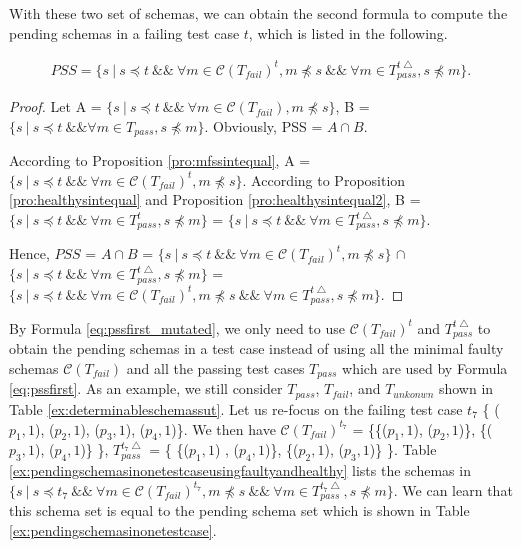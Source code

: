 With these two set of schemas, we can obtain the second formula to compute the pending schemas in a failing test case $t$, which is listed in the following.

\begin{equation}
\begin{aligned}\label{eq:pssfirst_mutated}
PSS=\{ s\ |\ s \preceq t\ \&\&\ \forall m \in \mathcal{C}(T_{fail})^{t},  m \npreceq s  \ \&\&\  \forall m \in T_{pass}^{t\bigtriangleup}, s \npreceq m \} .
\end{aligned}
\end{equation}

\begin{proof}

Let A = $\{ s\ |\  s \preceq t\ \&\&\ \forall m \in \mathcal{C}(T_{fail}),  m \npreceq s \}$, B = $ \{ s\ |\ s \preceq t\ \&\&  \forall m \in T_{pass}, s \npreceq m \} $. Obviously, PSS = $A \cap B$.

According to Proposition \ref{pro:mfssintequal}, A = $\{ s\ |\  s \preceq t\ \&\&\ \forall m \in \mathcal{C}(T_{fail})^{t},  m \npreceq s \}$.
According to Proposition \ref{pro:healthysintequal} and Proposition \ref{pro:healthysintequal2}, B = $\{ s\ |\  s \preceq t\ \&\&\ \forall m \in T_{pass}^{t},  s \npreceq m \}$ = $\{ s\ |\  s \preceq t\ \&\&\ \forall m \in T_{pass}^{t\bigtriangleup},  s \npreceq m \}$.

Hence, $PSS$ = $A \cap B$ = $\{ s\ |\  s \preceq t\ \&\&\ \forall m \in \mathcal{C}(T_{fail})^{t},  m \npreceq s \}$ $\cap$ $\{ s\ |\  s \preceq t\ \&\&\ \forall m \in T_{pass}^{t\bigtriangleup},  s \npreceq m \}$ = $\{ s\ |\ s \preceq t\ \&\&\ \forall m \in \mathcal{C}(T_{fail})^{t},  m \npreceq s  \ \&\&\  \forall m \in T_{pass}^{t\bigtriangleup}, s \npreceq m \}$.
\end{proof}

By Formula \ref{eq:pssfirst_mutated}, we only need to use $\mathcal{C}(T_{fail})^{t}$ and $T_{pass}^{t\bigtriangleup}$ to obtain the pending schemas in a test case instead of using all the minimal faulty schemas $\mathcal{C}(T_{fail})$ and all the passing test cases $ T_{pass}$ which are used by Formula \ref{eq:pssfirst}. As an example, we still consider  $T_{pass}$, $T_{fail}$, and $T_{unkonwn}$ shown in Table \ref{ex:determinableschemassut}. Let us re-focus on the failing test case $t_{7}$ \{ ($p_{1}, 1$), ($p_{2}, 1$), ($p_{3}, 1$), ($p_{4}, 1$)\}. We then have  $\mathcal{C}(T_{fail})^{t_{7}}$ = \{\{($p_{1}, 1$), ($p_{2}, 1$)\}, \{($p_{3}, 1$), ($p_{4}, 1$)\} \}, $T_{pass}^{t_{7}\bigtriangleup}$ = \{ \{($p_{1}, 1$) , ($p_{4}, 1$)\}, \{($p_{2}, 1$), ($p_{3}, 1$)\} \}.  Table \ref{ex:pendingschemasinonetestcaseusingfaultyandhealthy} lists the schemas in $\{ s\ |\ s \preceq t_{7}\ \&\&\ \forall m \in \mathcal{C}(T_{fail})^{t_{7}},  m \npreceq s  \ \&\&\  \forall m \in T_{pass}^{t_{7}\bigtriangleup}, s \npreceq m \} $. We can learn that this schema set is equal to the pending schema set which is shown in Table \ref{ex:pendingschemasinonetestcase}.

